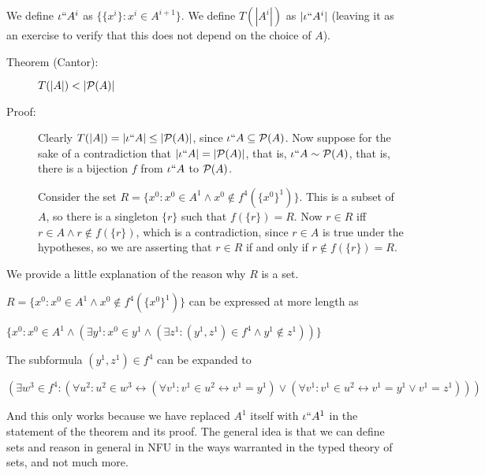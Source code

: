 \documentclass{slides}
\begin{document}
\begin{slide}

We define $\iota``A^i$ as $\{\{x^i\}:x^i \in A^{i+1}\}$.  We define $T(|A^i|)$ as $|\iota``A^i|$ (leaving it as an exercise to verify that this does not depend on the choice of $A$).

\begin{description}

\item[Theorem (Cantor):]  $T(|A|) < |{\cal P}(A)|$

\item[Proof:]  Clearly $T(|A|) = |\iota``A| \leq |{\cal P}(A)|$, since $\iota``A \subseteq {\cal P}(A)$.  Now suppose for the sake of a contradiction that
$|\iota``A| = |{\cal P}(A)|$, that is, $\iota``A \sim {\cal P}(A)$, that is, there is a bijection $f$ from $\iota``A$ to ${\cal P}(A)$.

Consider the set $R = \{x^0:x^0 \in A^1 \wedge x^0 \not\in f^4(\{x^0\}^1)\}$.  This is a subset of $A$, so there is a singleton $\{r\}$ such that $f(\{r\}) = R$.
Now $r \in R$ iff $r \in A \wedge r \not\in f(\{r\})$, which is a contradiction, since $r \in A$ is true under the hypotheses, so we are asserting that $r \in R$ if and only if $r \not\in f(\{r\})=R$.

\end{description}

\end{slide}

\begin{slide}

We provide a little explanation of the reason why $R$ is a set.

$R = \{x^0:x^0 \in A^1 \wedge x^0 \not\in f^4(\{x^0\}^1)\}$ can be expressed at more length as

$\{x^0:x^0 \in A^1 \wedge (\exists y^1:x^0 \in y^1 \wedge (\exists z^1:(y^1,z^1) \in f^4 \wedge y^1 \not\in z^1))\}$

The subformula $(y^1,z^1) \in f^4$ can be expanded to

$(\exists w^3 \in f^4:(\forall u^2:u^2 \in w^3 \leftrightarrow (\forall v^1:v^1 \in u^2 \leftrightarrow v^1=y^1) \vee  (\forall v^1:v^1 \in u^2 \leftrightarrow v^1=y^1 \vee v^1=z^1)))$

And this only works because we have replaced $A^1$ itself with $\iota``A^1$ in the statement of the theorem and its proof.  The general idea is that we can define sets and reason in general in NFU in the ways warranted in the typed theory of sets, and not much more.

\end{slide}
\end{document}
